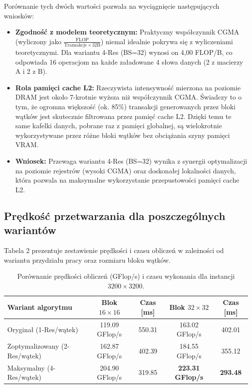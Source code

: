 \documentclass[10pt]{article}
\begin{document}
Porównanie tych dwóch wartości pozwala na wyciągnięcie następujących wniosków:
\begin{itemize}
    \item \textbf{Zgodność z modelem teoretycznym:} Praktyczny współczynnik CGMA (wyliczony jako $\frac{\text{FLOP}}{\text{Transakcje} \times 32\text{B}}$) niemal idealnie pokrywa się z wyliczeniami teoretycznymi. Dla wariantu 4-Res (BS=32) wynosi on 4,00 FLOP/B, co odpowiada 16 operacjom na każde załadowane 4 słowa danych (2 z macierzy A i 2 z B).
    \item \textbf{Rola pamięci cache L2:} Rzeczywista intensywność mierzona na poziomie DRAM jest około 7-krotnie wyższa niż współczynnik CGMA. Świadczy to o tym, że ogromna większość (ok. 85\%) transakcji generowanych przez bloki wątków jest skutecznie filtrowana przez pamięć cache L2. Dzięki temu te same kafelki danych, pobrane raz z pamięci globalnej, są wielokrotnie wykorzystywane przez różne bloki wątków bez obciążania szyny pamięci VRAM.
    \item \textbf{Wniosek:} Przewaga wariantu 4-Res (BS=32) wynika z synergii optymalizacji na poziomie rejestrów (wysoki CGMA) oraz doskonałej lokalności danych, która pozwala na maksymalne wykorzystanie przepustowości pamięci cache L2.
\end{itemize}

\subsection*{Prędkość przetwarzania dla poszczególnych wariantów}
Tabela 2 prezentuje zestawienie prędkości i czasu obliczeń w zależności od wariantu przydziału pracy oraz rozmiaru bloku wątków.

\begin{table}[h!]
\centering
\begingroup
\begin{tabular}{|l|c|c|c|c|}
\hline
\textbf{Wariant algorytmu} & \textbf{Blok $16 \times 16$} & \textbf{Czas [ms]} & \textbf{Blok $32 \times 32$} & \textbf{Czas [ms]} \\
\hline
Oryginał (1-Res/wątek) & 119.09 GFlop/s & 550.31 & 163.02 GFlop/s & 402.01 \\
\hline
Zoptymalizowany (2-Res/wątek) & 162.87 GFlop/s & 402.39 & 184.55 GFlop/s & 355.12 \\
\hline
Maksymalny (4-Res/wątek) & 204.90 GFlop/s & 319.85 & \textbf{223.31 GFlop/s} & \textbf{293.48} \\
\hline
\end{tabular}
\endgroup
\caption{Porównanie prędkości obliczeń (GFlop/s) i czasu wykonania dla instancji $3200 \times 3200$.}
\end{table}
\end{document}
